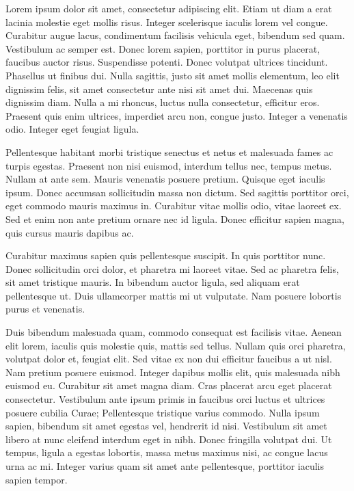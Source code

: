 \documentclass[]{friggeri-cv}
\begin{document}
    Lorem ipsum dolor sit amet, consectetur adipiscing elit. Etiam ut diam a erat lacinia molestie eget mollis risus. Integer scelerisque iaculis lorem vel congue. Curabitur augue lacus, condimentum facilisis vehicula eget, bibendum sed quam. Vestibulum ac semper est. Donec lorem sapien, porttitor in purus placerat, faucibus auctor risus. Suspendisse potenti. Donec volutpat ultrices tincidunt. Phasellus ut finibus dui. Nulla sagittis, justo sit amet mollis elementum, leo elit dignissim felis, sit amet consectetur ante nisi sit amet dui. Maecenas quis dignissim diam. Nulla a mi rhoncus, luctus nulla consectetur, efficitur eros. Praesent quis enim ultrices, imperdiet arcu non, congue justo. Integer a venenatis odio. Integer eget feugiat ligula.
    
    Pellentesque habitant morbi tristique senectus et netus et malesuada fames ac turpis egestas. Praesent non nisi euismod, interdum tellus nec, tempus metus. Nullam at ante sem. Mauris venenatis posuere pretium. Quisque eget iaculis ipsum. Donec accumsan sollicitudin massa non dictum. Sed sagittis porttitor orci, eget commodo mauris maximus in. Curabitur vitae mollis odio, vitae laoreet ex. Sed et enim non ante pretium ornare nec id ligula. Donec efficitur sapien magna, quis cursus mauris dapibus ac.
    
    Curabitur maximus sapien quis pellentesque suscipit. In quis porttitor nunc. Donec sollicitudin orci dolor, et pharetra mi laoreet vitae. Sed ac pharetra felis, sit amet tristique mauris. In bibendum auctor ligula, sed aliquam erat pellentesque ut. Duis ullamcorper mattis mi ut vulputate. Nam posuere lobortis purus et venenatis.
    
    Duis bibendum malesuada quam, commodo consequat est facilisis vitae. Aenean elit lorem, iaculis quis molestie quis, mattis sed tellus. Nullam quis orci pharetra, volutpat dolor et, feugiat elit. Sed vitae ex non dui efficitur faucibus a ut nisl. Nam pretium posuere euismod. Integer dapibus mollis elit, quis malesuada nibh euismod eu. Curabitur sit amet magna diam. Cras placerat arcu eget placerat consectetur. Vestibulum ante ipsum primis in faucibus orci luctus et ultrices posuere cubilia Curae; Pellentesque tristique varius commodo. Nulla ipsum sapien, bibendum sit amet egestas vel, hendrerit id nisi. Vestibulum sit amet libero at nunc eleifend interdum eget in nibh. Donec fringilla volutpat dui. Ut tempus, ligula a egestas lobortis, massa metus maximus nisi, ac congue lacus urna ac mi. Integer varius quam sit amet ante pellentesque, porttitor iaculis sapien tempor.

\fi
\end{document}
